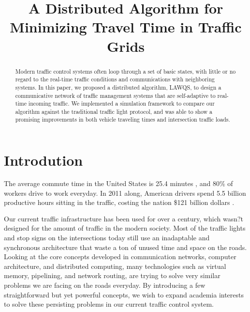 \documentclass[conference]{IEEEtran}
\begin{document}
\title{A Distributed Algorithm for Minimizing Travel Time in Traffic Grids}

\author{
\and
{}
}
\maketitle
\onehalfspace
\begin{abstract}
Modern traffic control systems often loop through a set of basic states, with little or no regard to the real-time traffic conditions and communications with neighboring systems. In this paper, we proposed a distributed algorithm, LAWQS, to design a communicative network of traffic management systems that are self-adaptive to real-time incoming traffic. We implemented a simulation framework to compare our algorithm against the traditional traffic light protocol, and was able to show a promising improvements in both vehicle traveling times and intersection traffic loads.
\end{abstract}

\section{Introdution}

The average commute time in the United States is 25.4 minutes \cite{}, and 80\% of workers drive to work everyday. In 2011 along, American drivers spend 5.5 billion productive hours sitting in the traffic, costing the nation \$121 billion dollars \cite{}. 

Our current traffic infrastructure has been used for over a century, which wasn?t designed for the amount of traffic in the modern society. Most of the traffic lights and stop signs on the intersections today still use an inadaptable and synchronous architecture that waste a ton of unused time and space on the roads. Looking at the core concepts developed in communication networks, computer architecture, and distributed computing, many technologies such as virtual memory, pipelining, and network routing, are trying to solve very similar problems we are facing on the roads everyday. By introducing a few straightforward but yet powerful concepts, we wish to expand academia interests to solve these persisting problems in our current traffic control system.
\end{document}
